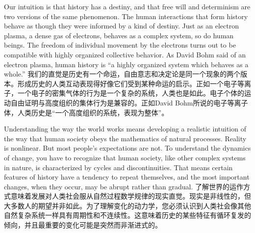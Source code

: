 \begin{Parallel}{97mm}{45mm}
  \ParallelLText
  {Our intuition is that history has a destiny, and that free will and determinism are two versions of the same phenomenon. The human interactions that form history behave as though they were informed by a kind of destiny. Just as an electron plasma, a dense gas of electrons, behaves as a complex system, so do human beings. The freedom of individual movement by the electrons turns out to be compatible with highly organized collective behavior. As David Bohm said of an electron plasma, human history is “a highly organized system which behaves as a whole.”}  
  \ParallelRText
  {\small 我们的直觉是历史有一个命运，自由意志和决定论是同一个现象的两个版本。形成历史的人类互动表现得好像它们受到某种命运的启示。正如一个电子等离子，一个电子的密集气体的行为是一个复杂的系统，人类也是如此。电子个体的运动自由证明与高度组织的集体行为是兼容的。正如David Bohm所说的电子等离子体，人类历史是“一个高度组织的系统，表现为整体”。}
  \ParallelPar


  \ParallelLText
  {Understanding the way the world works means developing a realistic intuition of the way that human society obeys the mathematics of natural processes. Reality is nonlinear. But most people's expectations are not. To understand the dynamics of change, you have to recognize that human society, like other complex systems in nature, is characterized by cycles and discontinuities. That means certain features of history have a tendency to repeat themselves, and the most important changes, when they occur, may be abrupt rather than gradual. }  
  \ParallelRText
  {\small 了解世界的运作方式意味着发展对人类社会服从自然过程数学规律的现实直觉。现实是非线性的，但大多数人的期望并非如此。为了理解变化的动力学，您必须认识到人类社会像其他自然复杂系统一样具有周期性和不连续性。这意味着历史的某些特征有循环复发的倾向，并且最重要的变化可能是突然而非渐进式的。}
  \ParallelPar



\end{Parallel}
